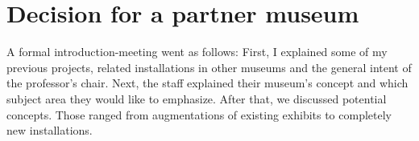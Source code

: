 
%


\section{Decision for a partner museum}
\label{partnering_decision}

A formal introduction-meeting went as follows: First, I explained some of my previous projects, related installations in other museums and the general intent of the professor's chair. Next, the staff explained their museum's concept and which subject area they would like to emphasize. After that, we discussed potential concepts. Those ranged from augmentations of existing exhibits to completely new installations.

